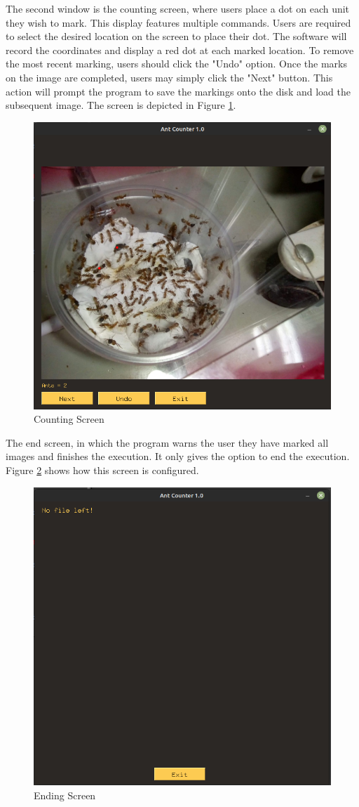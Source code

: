The second window is the counting screen, where users place a dot on each unit they wish to mark. This display features multiple commands. Users are required to select the desired location on the screen to place their dot. The software will record the coordinates and display a red dot at each marked location. To remove the most recent marking, users should click the "Undo" option. Once the marks on the image are completed, users may simply click the "Next" button. This action will prompt the program to save the markings onto the disk and load the subsequent image. The screen is depicted in Figure \ref{fig:count-screen}.

\begin{figure}[h!]
    \centering
    \includegraphics[width = .6\linewidth]{Figures/screen-2.png}
    \caption{Counting Screen}
    \label{fig:count-screen}
\end{figure}

The end screen, in which the program warns the user they have marked all images and finishes the execution. It only gives the option to end the execution. Figure \ref{fig:end-screen} shows how this screen is configured.

\begin{figure}[h!]
    \centering
    \includegraphics[width = .6\linewidth]{Figures/screen-3.png}
    \caption{Ending Screen}
    \label{fig:end-screen}
\end{figure}

